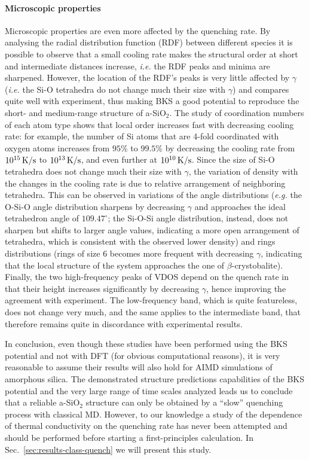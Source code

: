 \paragraph{Microscopic properties}
Microscopic properties are even more affected by the quenching rate. 
By analysing the radial distribution function (RDF) between different species it is possible to observe that a small cooling rate makes the structural order at short and intermediate distances increase, \emph{i.e.} the RDF peaks and minima are sharpened. However, the location of the RDF's peaks is very little affected by $\gamma$ (\emph{i.e.} the Si-O tetrahedra do not change much their size with $\gamma$) and compares quite well with experiment, thus making BKS a good potential to reproduce the short- and medium-range structure of a-SiO$_2$. 
The study of coordination numbers of each atom type shows that local order increases fast with decreasing cooling rate: for example, the number of Si atoms that are 4-fold coordinated with oxygen atoms increases from $95\%$ to $99.5\%$ by decreasing the cooling rate from $10^{15}\,\mathrm{K/s}$ to $10^{13}\,\mathrm{K/s}$, and even further at $10^{10}\,\mathrm{K/s}$.
Since the size of Si-O tetrahedra does not change much their size with $\gamma$, the variation of density with the changes in the cooling rate is due to relative arrangement of neighboring tetrahedra. 
This can be observed in variations of the angle distributions (\emph{e.g.} the O-Si-O angle distribution sharpens by decreasing $\gamma$ and approaches the ideal tetrahedron angle of $109.47^\circ$; the Si-O-Si angle distribution, instead, does not sharpen but shifts to larger angle values, indicating a more open arrangement of tetrahedra, which is consistent with the observed lower density) and rings distributions (rings of size $6$ becomes more frequent with decreasing $\gamma$, indicating that the local structure of the system approaches the one of $\beta$-crystobalite). 
Finally, the two high-frequency peaks of VDOS depend on the quench rate in that their height increases significantly by decreasing $\gamma$, hence improving the agreement with experiment. The low-frequency band, which is quite featureless, does not change very much, and the same applies to the intermediate band, that therefore remains quite in discordance with experimental results. 

\begin{LEtext}
In conclusion, even though these studies have been performed using the BKS potential and not with DFT (for obvious computational reasons), it is very reasonable to assume their results will also hold for AIMD simulations of amorphous silica. 
The demonstrated structure predictions capabilities of the BKS potential and the very large range of time scales analyzed leads us to conclude that a reliable a-SiO$_2$ structure can only be obtained by a ``slow'' quenching process with classical MD. 
However, to our knowledge a study of the dependence of thermal conductivity on the quenching rate has never been attempted and should be performed before starting a first-principles calculation. In Sec.~\ref{sec:results-class-quench} we will present this study. 
\end{LEtext}


